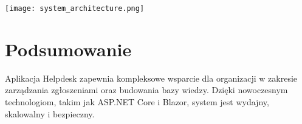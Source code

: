 \documentclass[a4paper,12pt]{article}
\begin{document}
\begin{center}
\texttt{[image: system\_architecture.png]}
\end{center}

\newpage

\section{Podsumowanie}
Aplikacja Helpdesk zapewnia kompleksowe wsparcie dla organizacji w zakresie zarządzania zgłoszeniami oraz budowania bazy wiedzy. Dzięki nowoczesnym technologiom, takim jak ASP.NET Core i Blazor, system jest wydajny, skalowalny i bezpieczny.
\end{document}
